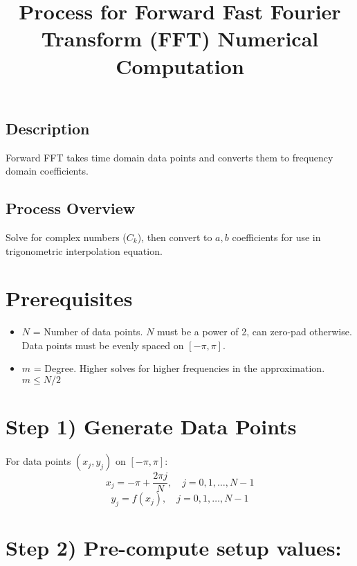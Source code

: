 \documentclass[12pt]{article}
\title{Process for Forward Fast Fourier Transform (FFT) Numerical Computation}
\author{}
\date{}
\begin{document}
\maketitle
\subsection*{Description}
Forward FFT takes time domain data points and converts them to frequency domain coefficients.

\subsection*{Process Overview}
Solve for complex numbers ($C_k$), then convert to $a,b$ coefficients for use in trigonometric interpolation equation. 

\section*{Prerequisites}
\begin{itemize}
    \item $N$ = Number of data points. $N$ must be a power of 2, can zero-pad otherwise. Data points must be evenly spaced on $[-\pi,\pi]$.
    \item $m$ = Degree. Higher solves for higher frequencies in the approximation. $m \leq N/2$
\end{itemize}

\section*{Step 1) Generate Data Points}
For data points $(x_j,y_j)$ on $[-\pi,\pi]$:
\[x_j = -\pi + \frac{2\pi j}{N}, \quad j=0,1,\ldots,N-1\]
\[y_j = f(x_j), \quad j=0,1,\ldots,N-1\]

\section*{Step 2) Pre-compute setup values:}
\end{document}
